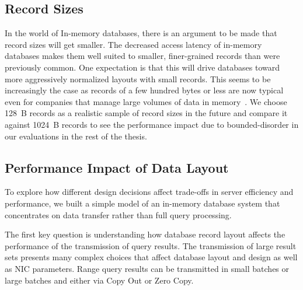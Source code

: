 \subsection{Record Sizes}
In the world of In-memory databases, there is an argument to be made that record sizes will get smaller.
The decreased access latency of in-memory databases makes them well suited to smaller, finer-grained records
than were previously common. One expectation is that this will drive databases
toward more aggressively normalized layouts with small records. This
seems to be increasingly the case as records of a few hundred bytes or less
are now typical even for companies that manage large volumes of data in memory~\cite{fb-memcache,fb-workload,inmemoryworkload}. 
We choose 128~B records as a realistic sample of record sizes in the future and compare it against 
1024~B records to see the performance impact due to bounded-disorder in our evaluations in the rest of the thesis.



\subsection{Performance Impact of Data Layout}
\label{sec:zero-copy-tput}

%
To explore how different design decisions affect trade-offs in server efficiency and
performance, we built a simple model of an in-memory database system that
concentrates on data transfer rather than full query processing.

The first key question is understanding how database record layout affects the
performance of the transmission of query results.  The transmission of large
result sets presents many complex choices that affect
database layout and design as well as NIC parameters.  Range query
results can be transmitted in small batches or large batches and either via
Copy Out or Zero Copy.

